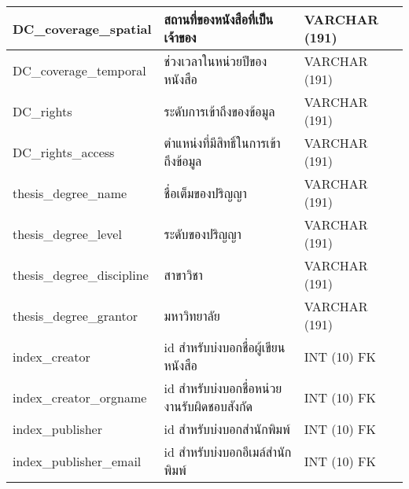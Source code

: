 \begin{longtable}[l]{|l|l|l|}
DC\_coverage\_spatial                & สถานที่ของหนังสือที่เป็นเจ้าของ                               & VARCHAR   (191)                                                      \\ \hline
DC\_coverage\_temporal               & ช่วงเวลาในหน่วยปีของหนังสือ                                   & VARCHAR   (191)                                                      \\ \hline
DC\_rights                           & ระดับการเข้าถึงของข้อมูล                                     & VARCHAR   (191)                                                      \\ \hline
DC\_rights\_access                   & ตำแหน่งที่มีสิทธิ์ในการเข้าถึงข้อมูล                         & VARCHAR   (191)                                                      \\ \hline
thesis\_degree\_name                 & ชื่อเต็มของปริญญา                                            & VARCHAR   (191)                                                      \\ \hline
thesis\_degree\_level                & ระดับของปริญญา                                               & VARCHAR   (191)                                                      \\ \hline
thesis\_degree\_discipline           & สาขาวิชา                                                     & VARCHAR   (191)                                                      \\ \hline
thesis\_degree\_grantor              & มหาวิทยาลัย                                                  & VARCHAR   (191)                                                      \\ \hline
index\_creator                       & id สำหรับบ่งบอกชื่อผู้เขียนหนังสือ                            & INT   (10) FK                                                        \\ \hline
index\_creator\_orgname              & id สำหรับบ่งบอกชื่อหน่วยงานรับผิดชอบสังกัด                   & INT   (10) FK                                                        \\ \hline
index\_publisher                     & id สำหรับบ่งบอกสำนักพิมพ์                                    & INT   (10) FK                                                        \\ \hline
index\_publisher\_email              & id สำหรับบ่งบอกอีเมล์สำนักพิมพ์                              & INT   (10) FK                                                        \\ \hline

\end{longtable}
